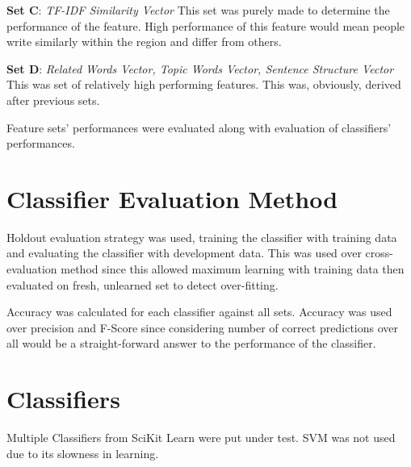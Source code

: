 \documentclass[11pt]{article}
\begin{document}
\textbf{Set C}:
\textit{TF-IDF Similarity Vector}
\newline
This set was purely made to determine the performance of the feature. High performance of this feature would mean people write similarly within the region and differ from others.
\newline

\textbf{Set D}:
\textit{Related Words Vector, Topic Words Vector, Sentence Structure Vector}
\newline
This was set of relatively high performing features. This was, obviously, derived after previous sets.
\newline

Feature sets' performances were evaluated along with evaluation of classifiers' performances.

\section{Classifier Evaluation Method}

Holdout evaluation strategy was used, training the classifier with training data and evaluating the classifier with development data. This was used over cross-evaluation method since this allowed maximum learning with training data then evaluated on fresh, unlearned set to detect over-fitting.\newline

Accuracy was calculated for each classifier against all sets.
Accuracy was used over precision and F-Score since considering number of correct predictions over all would be a straight-forward answer to the performance of the classifier.

 
\section{Classifiers}

Multiple Classifiers from SciKit Learn were put under test. SVM was not used due to its slowness in learning.
\end{document}
